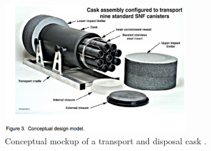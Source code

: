 \begin{figure}[htbp!]
  \begin{center}
    \includegraphics[width=0.7\textwidth]{./images/cask_ineel.eps}
  \end{center}
  \caption{Conceptual mockup of a transport and disposal cask 
    \cite{bridges_standardized_2001}.}
  \label{fig:packages}
\end{figure}
